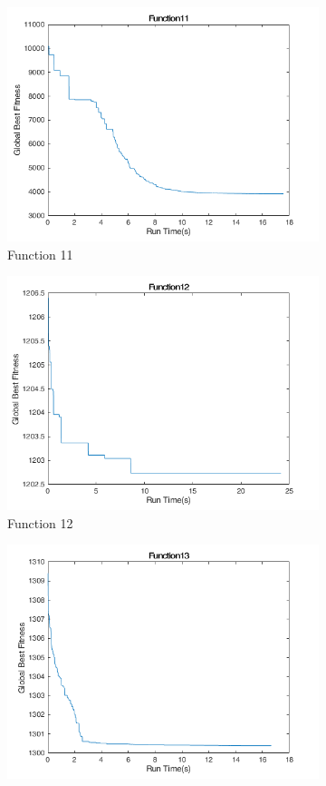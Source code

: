 \begin{figure}
\begin{subfigure}[b]{0.4\textwidth}
    \includegraphics[width=\textwidth]{img/cecrt/f11}
    \caption{Function 11}
  \end{subfigure}
  \begin{subfigure}[b]{0.4\textwidth}
    \includegraphics[width=\textwidth]{img/cecrt/f12}
    \caption{Function 12}
  \end{subfigure}
  \begin{subfigure}[b]{0.4\textwidth}
    \includegraphics[width=\textwidth]{img/cecrt/f13}

\end{subfigure}
\end{figure}
